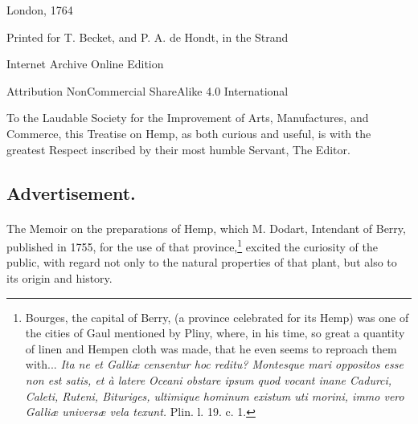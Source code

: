 \documentclass[a4paper, 11pt, oneside, polutonikogreek, english]{article}
\begin{document}
\begin{titlepage}
	
	
		
	\vspace*{\fill}%
	
	
	{London, 1764} %
 
        {\small Printed for T. Becket, and P. A. de Hondt, in the Strand}

	\vspace{1\baselineskip} %

        Internet Archive Online Edition  %
	
	{\small Attribution NonCommercial ShareAlike 4.0 International } %
\end{titlepage}
\clearpage
\setlength{\parskip}{1mm plus1mm minus1mm}
\tableofcontents
\clearpage
\vspace*{\fill}
\begin{center}
To the Laudable Society for the Improvement of Arts, Manufactures, and Commerce, this Treatise on Hemp, as both curious and useful, is with the greatest Respect inscribed by their most humble Servant, The Editor.
\end{center}
\vspace*{\fill}
\clearpage
\subsection*{Advertisement.}
\paragraph{}
The Memoir on the preparations of Hemp, which M. Dodart, Intendant of Berry, published in 1755, for the use of that province,\footnote{Bourges, the capital of Berry, (a province celebrated for its Hemp) was one of the cities of Gaul mentioned by Pliny, where, in his time, so great a quantity of linen and Hempen cloth was made, that he even seems to reproach them with... \emph{Ita ne et Galliæ censentur hoc reditu? Montesque mari oppositos esse non est satis, et à latere Oceani obstare ipsum quod vocant inane Cadurci, Caleti, Ruteni, Bituriges, ultimique hominum existum uti morini, immo vero Galliæ universæ vela texunt.} Plin. l. 19. c. 1.} excited the curiosity of the public, with regard not only to the natural properties of that plant, but also to its origin and history.
\end{document}
